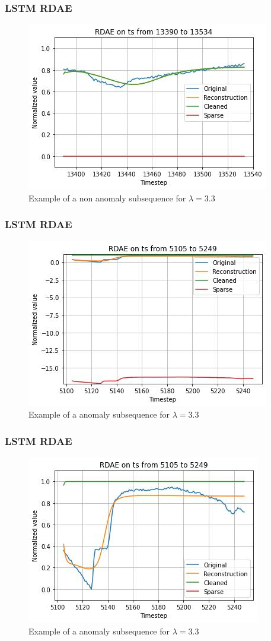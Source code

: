 \documentclass{beamer}
\theoremstyle{plain}
\theoremstyle{definition}
\theoremstyle{remark}
\begin{document}
\begin{frame}
	\frametitle{LSTM RDAE}
	\begin{figure}
		\centering
		\includegraphics[width=0.7\linewidth]{Images/LSTMlam3.3ts_non_anomaly13390.jpg}
		\caption[]{Example of a non anomaly subsequence for $\lambda=3.3$}
	\end{figure}
\end{frame}

\begin{frame}
	\frametitle{LSTM RDAE}
	\begin{figure}
		\centering
		\includegraphics[width=0.7\linewidth]{Images/LSTMlam3.3ts_anomaly5105.jpg}
		\caption[]{Example of a anomaly subsequence for $\lambda=3.3$}
	\end{figure}
\end{frame}

\begin{frame}
	\frametitle{LSTM RDAE}
	\begin{figure}
		\centering
		\includegraphics[width=0.7\linewidth]{Images/LSTMlam3.3ts_anomalyzoom5105.jpg}
		\caption[]{Example of a anomaly subsequence for $\lambda=3.3$}
	\end{figure}
\end{frame}
\end{document}
